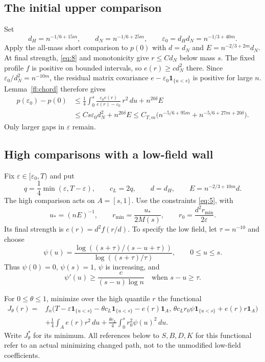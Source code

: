 \subsection{The initial upper comparison}

Set
\[
 d_H=n^{-1/6+15m},\qquad d_N=n^{-1/6+25m},\qquad
 \varepsilon_0=d_Hd_N=n^{-1/3+40m}.
\]
Apply the all-mass short comparison to $p(0)$ with $d=d_N$ and
$E=n^{-2/3+2m}d_N$.  At final strength, \eqref{eq:8} and monotonicity
give $r\le C d_N$ below mass $s$.  The fixed profile $f$ is positive
on bounded intervals, so $e(r)\ge c d_N^2$ there.  Since
$\varepsilon_0/d_N^2=n^{-10m}$, the residual matrix covariance
$e-\varepsilon_0\mathbf1_{\{u<s\}}$ is positive for large $n$.
Lemma~\ref{fl:chord} therefore gives
\[
\begin{split}
 p(\varepsilon_0)-p(0)
 &\le\frac14\int_0^s
       \frac{\varepsilon_0e(r)}{e(r)-\varepsilon_0}\,r^2\,du
       +n^{20\delta}E\\
 &\le C s\varepsilon_0d_N^2+n^{20\delta}E
 \le C_{T,m}\bigl(n^{-5/6+95m}
                    +n^{-5/6+27m+20\delta}\bigr).
\end{split}
\]
Only larger gaps in $\varepsilon$ remain.

\subsection{High comparisons with a low-field wall}

Fix $\varepsilon\in[\varepsilon_0,T)$ and put
\[
 q=\frac14\min(\varepsilon,T-\varepsilon),\qquad c_L=2q,
 \qquad d=d_H,\qquad E=n^{-2/3+10m}d.
\]
The high comparison acts on $A=[s,1]$.  Use the constraints
\eqref{eq:5}, with
\[
 u_*=(nE)^{-1},\qquad r_{\min}=\frac{u_*}{2M(s)},\qquad
 r_0=\frac{d^2r_{\min}}{2\varepsilon}.
\]
Its final strength is $e(r)=d^2f(r/d)$.  To specify the low field,
let $\tau=n^{-10}$ and choose
\[
 \psi(u)=\frac{\log((s+\tau)/(s-u+\tau))}
                    {\log((s+\tau)/\tau)},\qquad 0\le u\le s.
\]
Thus $\psi(0)=0$, $\psi(s)=1$, $\psi$ is increasing, and
\[
 \psi'(u)\ge\frac{c}{(s-u)\log n}
               \quad\text{when }s-u\ge\tau.
\]

For $0\le\theta\le1$, minimize over the high quantile $r$ the
functional
\[
\begin{split}
 J_\theta(r)={}&
 f_n\bigl(T-\varepsilon\mathbf1_{\{u<s\}}
            -\theta c_L\mathbf1_{\{u<s\}}-e(r)\mathbf1_A,\,
          \theta c_Lr_0\psi\mathbf1_{\{u<s\}}
                              +e(r)r\mathbf1_A\bigr)\\
 &+\frac14\int_Ae(r)r^2\,du
       +\frac{\theta c_L}{4}\int_0^s r_0^2\psi(u)^2\,du.
\end{split}
\]
Write $J_\theta^*$ for its minimum.  All references below to
$S,B,D,K$ for this functional refer to an actual minimizing changed
path, not to the unmodified low-field coefficients.

